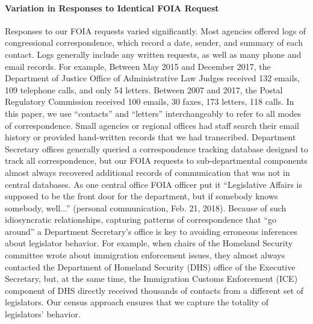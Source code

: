 \documentclass[12pt]{article}
\begin{document}
\paragraph{Variation in Responses to Identical FOIA Request} Responses to our FOIA requests varied significantly. Most agencies offered logs of congressional correspondence, which record a date, sender, and summary of each contact. Logs generally include any written requests, as well as many phone and email records. For example, Between May 2015 and December 2017, the Department of Justice Office of Administrative Law Judges received 132 emails, 109 telephone calls, and only 54 letters. Between 2007 and 2017, the Postal Regulatory Commission received 100 emails, 30 faxes, 173 letters, 118 calls. In this paper, we use ``contacts'' and ``letters'' interchangeably to refer to all modes of correspondence. Small agencies or regional offices had staff search their email history or provided hand-written records that we had transcribed. Department Secretary offices generally queried a correspondence tracking database designed to track all correspondence, but our FOIA requests to sub-departmental components almost always recovered additional records of communication that was not in central databases. As one central office FOIA officer put it ``Legislative Affairs is supposed to be the front door for the department, but if somebody knows somebody, well...'' (personal communication, Feb. 21, 2018). Because of such idiosyncratic relationships, capturing patterns of correspondence that ``go around'' a Department Secretary's office is key to avoiding erroneous inferences about legislator behavior. For example, when chairs of the Homeland Security committee wrote about immigration enforcement issues, they almost always contacted the Department of Homeland Security (DHS) office of the Executive Secretary, but, at the same time, the Immigration Customs Enforcement (ICE) component of DHS directly received thousands of contacts from a different set of legislators. Our census approach ensures that we capture the totality of legislators' behavior. 
\end{document}
